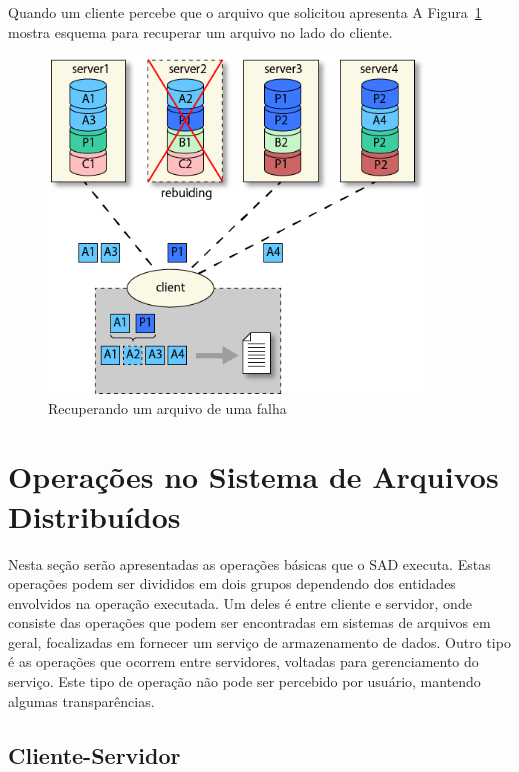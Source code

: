	Quando um cliente percebe que o arquivo que solicitou apresenta  
	A Figura~\ref{fig:img2} mostra esquema para recuperar um arquivo no lado do cliente.
	
	\begin{figure}[htb]
		\begin{center}
			
			\includegraphics[clip,width=10.0cm]{images/image2.png}
			\caption{Recuperando um arquivo de uma falha}
			\label{fig:img2}
		\end{center}
	\end{figure}
	
	\section{Operações no Sistema de Arquivos Distribuídos}
	
	Nesta seção serão apresentadas as operações básicas que o SAD executa. Estas operações podem ser divididos em dois grupos dependendo dos entidades envolvidos na operação executada. Um deles é entre cliente e servidor, onde consiste das operações que podem ser encontradas em sistemas de arquivos em geral, focalizadas em fornecer um serviço de armazenamento de dados. Outro tipo é as operações que ocorrem entre servidores, voltadas para gerenciamento do serviço. Este tipo de operação não pode ser percebido por usuário, mantendo algumas transparências.
	
	
	
	\subsection{Cliente-Servidor}
	
